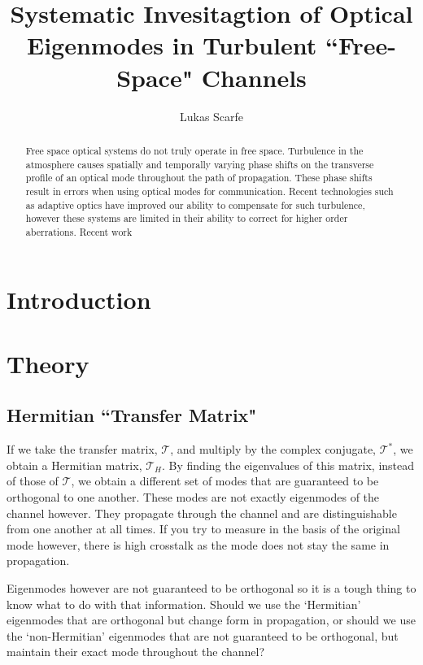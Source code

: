 \documentclass[]{article}
\title{Systematic Invesitagtion of Optical Eigenmodes in Turbulent ``Free-Space" Channels}
\author{Lukas Scarfe}
\newcommand{\T}{\mathcal{T}}
\begin{document}
\maketitle

\begin{abstract}
Free space optical systems do not truly operate in free space.
Turbulence in the atmosphere causes spatially and temporally varying phase shifts on the transverse profile of an optical mode throughout the path of propagation.
These phase shifts result in errors when using optical modes for communication.
Recent technologies such as adaptive optics have improved our ability to compensate for such turbulence, however these systems are limited in their ability to correct for higher order aberrations. Recent work 

\end{abstract}

\section{Introduction}

\section{Theory}

\subsection{Hermitian ``Transfer Matrix"}
If we take the transfer matrix, $\T$, and multiply by the complex conjugate, $\T^*$, we obtain a Hermitian matrix, $\T_H$.
By finding the eigenvalues of this matrix, instead of those of $\T$, we obtain a different set of modes that are guaranteed to be orthogonal to one another.
These modes are not exactly eigenmodes of the channel however.
They propagate through the channel and are distinguishable from one another at all times. If you try to measure in the basis of the original mode however, there is high crosstalk as the mode does not stay the same in propagation.

Eigenmodes however are not guaranteed to be orthogonal so it is a tough thing to know what to do with that information.
Should we use the `Hermitian' eigenmodes that are orthogonal but change form in propagation, or should we use the `non-Hermitian' eigenmodes that are not guaranteed to be orthogonal, but maintain their exact mode throughout the channel?
\end{document}
